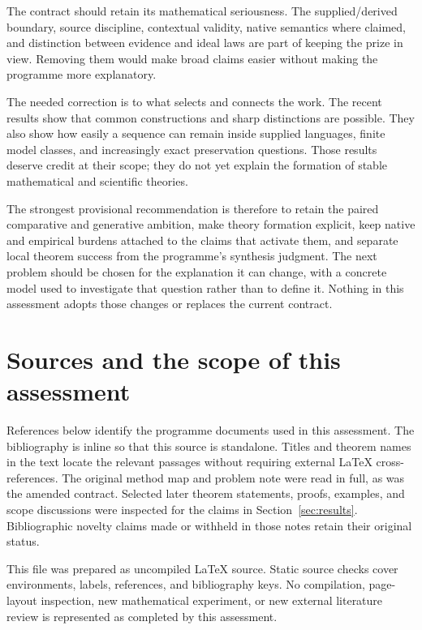 \documentclass[11pt]{article}
\begin{document}
The contract should retain its mathematical seriousness. The supplied/derived boundary, source discipline, contextual validity, native semantics where claimed, and distinction between evidence and ideal laws are part of keeping the prize in view. Removing them would make broad claims easier without making the programme more explanatory.

The needed correction is to what selects and connects the work. The recent results show that common constructions and sharp distinctions are possible. They also show how easily a sequence can remain inside supplied languages, finite model classes, and increasingly exact preservation questions. Those results deserve credit at their scope; they do not yet explain the formation of stable mathematical and scientific theories.

The strongest provisional recommendation is therefore to retain the paired comparative and generative ambition, make theory formation explicit, keep native and empirical burdens attached to the claims that activate them, and separate local theorem success from the programme's synthesis judgment. The next problem should be chosen for the explanation it can change, with a concrete model used to investigate that question rather than to define it. Nothing in this assessment adopts those changes or replaces the current contract.

\appendix
\section{Sources and the scope of this assessment}
\label{app:sources}

References below identify the programme documents used in this assessment. The bibliography is inline so that this source is standalone. Titles and theorem names in the text locate the relevant passages without requiring external LaTeX cross-references. The original method map and problem note were read in full, as was the amended contract. Selected later theorem statements, proofs, examples, and scope discussions were inspected for the claims in Section~\ref{sec:results}. Bibliographic novelty claims made or withheld in those notes retain their original status.

This file was prepared as uncompiled \LaTeX{} source. Static source checks cover environments, labels, references, and bibliography keys. No compilation, page-layout inspection, new mathematical experiment, or new external literature review is represented as completed by this assessment.
\end{document}
